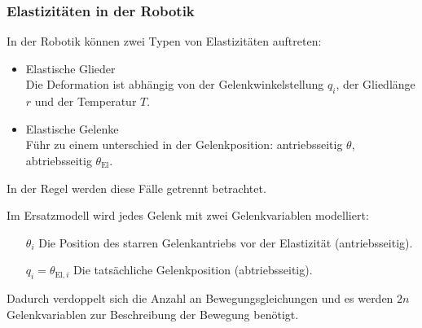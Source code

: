 			\subsubsection{Elastizitäten in der Robotik} %
				In der Robotik können zwei Typen von Elastizitäten auftreten:
				\begin{itemize}
					\item Elastische Glieder \\ Die Deformation ist abhängig von der Gelenkwinkelstellung \(q_i\), der Gliedlänge \(r\) und der Temperatur \(T\).
					\item Elastische Gelenke \\ Führ zu einem unterschied in der Gelenkposition: antriebsseitig \(\theta\), abtriebsseitig \(\theta_\text{El}\).
				\end{itemize}
				In der Regel werden diese Fälle getrennt betrachtet.

				Im Ersatzmodell wird jedes Gelenk mit zwei Gelenkvariablen modelliert:
				\begin{itemize}
					\item[\(\theta_i\)] Die Position des starren Gelenkantriebs vor der Elastizität (antriebsseitig).
					\item[\(q_i = \theta_{\text{El}, i}\)] Die tatsächliche Gelenkposition (abtriebsseitig).
				\end{itemize}
				Dadurch verdoppelt sich die Anzahl an Bewegungsgleichungen und es werden \(2n\) Gelenkvariablen zur Beschreibung der Bewegung benötigt.

